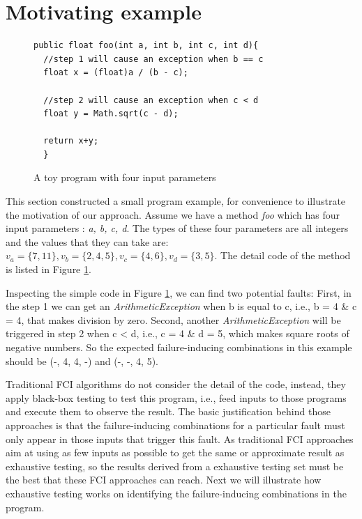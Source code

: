 \documentclass{sig-alternate}
\begin{document}
\section{Motivating example}
\begin{figure}
\begin{verbatim}
public float foo(int a, int b, int c, int d){
  //step 1 will cause an exception when b == c
  float x = (float)a / (b - c);

  //step 2 will cause an exception when c < d
  float y = Math.sqrt(c - d);

  return x+y;
  }
\end{verbatim}
\caption{A toy program with four input parameters}
\label{toy-program}
\end{figure}
This section constructed a small program example, for convenience to illustrate the motivation of our approach. Assume we have a method \emph{foo} which has four input parameters : \emph{a, b, c, d}. The types of these four parameters are all integers and the values that they can take are: $v_{a} = \{7, 11\}, v_{b} = \{2, 4, 5\}, v_{c} = \{4, 6\}, v_{d} = \{3, 5\}$. The detail code of the method is listed in Figure \ref{toy-program}.

Inspecting the simple code in Figure \ref{toy-program}, we can find two potential faults: First, in the step 1 we can get an \emph{ArithmeticException} when b is equal to c, i.e.,  b = 4 \& c = 4, that makes division by zero. Second, another \emph{ArithmeticException} will be triggered in step 2 when c < d, i.e., c = 4 \& d = 5, which makes square roots of negative numbers. So the expected failure-inducing combinations in this example should be (-, 4, 4, -) and (-, -, 4, 5).

Traditional FCI algorithms do not consider the detail of the code, instead, they apply black-box testing to test this program, i.e., feed inputs to those programs and execute them to observe the result. The basic justification behind those approaches is that the failure-inducing combinations for a particular fault must only appear in those inputs that trigger this fault. As traditional FCI approaches aim at using as few inputs as possible to get the same or approximate result as exhaustive testing, so the results derived from a exhaustive testing set must be the best that these FCI approaches can reach. Next we will illustrate how exhaustive testing works on identifying the failure-inducing combinations in the program.
\end{document}
